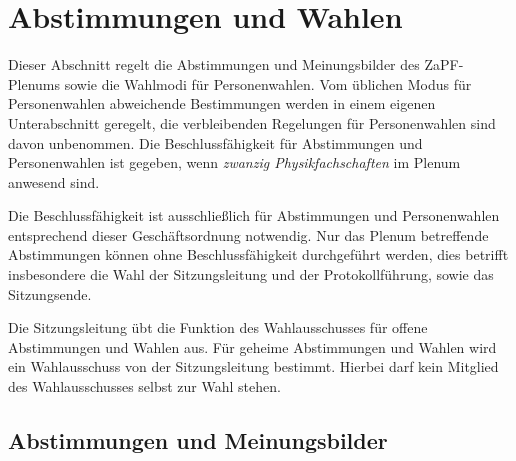 \documentclass[
  ngerman,
  a4paper,
  oneside]{scrartcl}
\begin{document}
\section{Abstimmungen und Wahlen}\label{abstimmungen-und-wahlen}

Dieser Abschnitt regelt die Abstimmungen und Meinungsbilder des
ZaPF-Plenums sowie die Wahlmodi für Personenwahlen. Vom üblichen Modus
für Personenwahlen abweichende Bestimmungen werden in einem eigenen
Unterabschnitt geregelt, die verbleibenden Regelungen für Personenwahlen
sind davon unbenommen. Die Beschlussfähigkeit für Abstimmungen und
Personenwahlen ist gegeben, wenn \emph{zwanzig Physikfachschaften} im
Plenum anwesend sind.

Die Beschlussfähigkeit ist ausschließlich für Abstimmungen und
Personenwahlen entsprechend dieser Geschäftsordnung notwendig. Nur das
Plenum betreffende Abstimmungen können ohne Beschlussfähigkeit
durchgeführt werden, dies betrifft insbesondere die Wahl der
Sitzungsleitung und der Protokollführung, sowie das Sitzungsende.

Die Sitzungsleitung übt die Funktion des Wahlausschusses für offene
Abstimmungen und Wahlen aus. Für geheime Abstimmungen und Wahlen wird
ein Wahlausschuss von der Sitzungsleitung bestimmt. Hierbei darf kein
Mitglied des Wahlausschusses selbst zur Wahl stehen.

\subsection{Abstimmungen und
Meinungsbilder}\label{abstimmungen-und-meinungsbilder}
\end{document}
